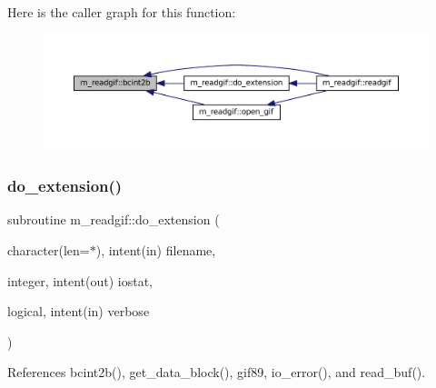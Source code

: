 Here is the caller graph for this function\+:\nopagebreak
\begin{figure}[H]
\begin{center}
\leavevmode
\includegraphics[width=350pt]{namespacem__readgif_a38594ce718f97f844771250edcd5e496_icgraph}
\end{center}
\end{figure}
\mbox{\label{namespacem__readgif_a93c5f69ee5054ba2c10ed17b8ab53f6b}} 
\subsubsection{\texorpdfstring{do\+\_\+extension()}{do\_extension()}}
{\footnotesize\ttfamily subroutine m\+\_\+readgif\+::do\+\_\+extension (\begin{DoxyParamCaption}\item[{character(len=$\ast$), intent(in)}]{filename,  }\item[{integer, intent(out)}]{iostat,  }\item[{logical, intent(in)}]{verbose }\end{DoxyParamCaption})\hspace{0.3cm}{\ttfamily [private]}}



References bcint2b(), get\+\_\+data\+\_\+block(), gif89, io\+\_\+error(), and read\+\_\+buf().

